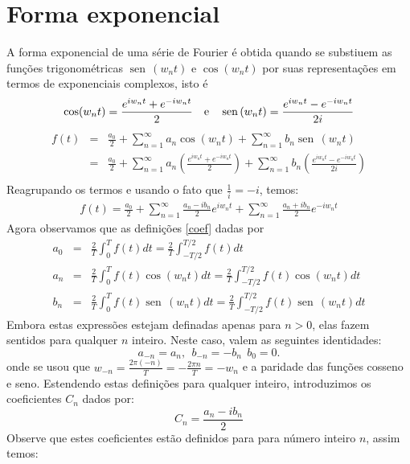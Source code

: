 \documentclass[a4paper,10pt]{book}
\newcommand{\sen}{\operatorname{sen}\,}
\begin{document}
\section{Forma exponencial}
A forma exponencial de uma série de Fourier é obtida quando se substiuem as funções trigonométricas $\sen(w_nt)$ e $\cos(w_nt)$ por suas representações em termos de exponenciais complexos, isto é
\begin{equation}\cos(w_nt)=\frac{e^{iw_nt}+ e^{-iw_nt}}{2}~~~\hbox{e}~~~\sen(w_nt)=\frac{e^{iw_nt}- e^{-iw_nt}}{2i}\end{equation}
\begin{eqnarray*}
f(t)&=&\frac{a_0}{2}+\sum_{n=1}^\infty a_n\cos(w_n t)+\sum_{n=1}^\infty b_n\sen(w_n t)\\
&=&\frac{a_0}{2}+\sum_{n=1}^\infty a_n\left(\frac{e^{iw_nt}+ e^{-iw_nt}}{2}\right)+\sum_{n=1}^\infty b_n\left(\frac{e^{iw_nt}- e^{-iw_nt}}{2i}\right)\\
\end{eqnarray*}
Reagrupando os termos e usando o fato que $\frac{1}{i}=-i$, temos:
\begin{eqnarray}\label{form_exp_1}
f(t)=\frac{a_0}{2}+\sum_{n=1}^\infty \frac{a_n-ib_n}{2}e^{iw_nt}+\sum_{n=1}^\infty \frac{a_n+ib_n}{2}e^{-iw_nt}
\end{eqnarray}
Agora observamos que as definições \ref{coef} dadas por  
\begin{eqnarray*}
   a_0&=& \frac{2}{T}\int_0^T f(t)dt = \frac{2}{T}\int_{-T/2}^{T/2} f(t)dt\\
   a_n&=& \frac{2}{T}\int_0^T f(t)\cos(w_n t)dt = \frac{2}{T}\int_{-T/2}^{T/2} f(t)\cos(w_nt)dt\\
   b_n&=& \frac{2}{T}\int_0^T f(t)\sen(w_n t)dt = \frac{2}{T}\int_{-T/2}^{T/2} f(t)\sen(w_nt)dt
  \end{eqnarray*}
Embora estas expressões estejam definadas apenas para $n>0$, elas fazem sentidos para qualquer $n$ inteiro. Neste caso, valem as seguintes identidades:
\begin{equation}a_{-n}=a_n,~~b_{-n}=-b_{n}~~b_0=0.\end{equation}
onde se usou que $w_{-n}=\frac{2\pi (-n)}{T}=-\frac{2\pi n}{T}=-w_n$ e a paridade das funções cosseno e seno.
Estendendo estas definições para qualquer inteiro, introduzimos os coeficientes $C_n$ dados por:
\begin{equation}\label{def_cn}
C_n = \frac{a_n - ib_n}{2}
\end{equation}
Observe que estes coeficientes estão definidos para para número inteiro $n$, assim temos:
\end{document}
